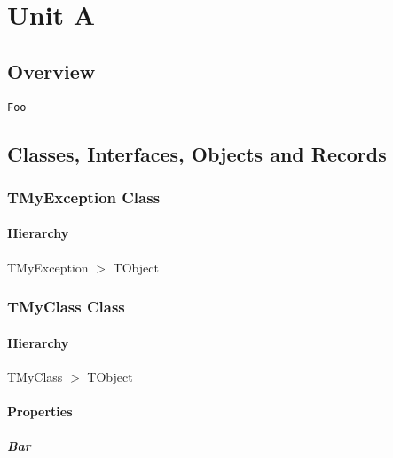 \documentclass{report}
\begin{document}
\newlength{\tmplength}
\chapter{Unit A}
\section{Overview}
\begin{description}
\item[\texttt{\begin{ttfamily}TMyException\end{ttfamily} Class}]
\item[\texttt{\begin{ttfamily}TMyClass\end{ttfamily} Class}]
\end{description}
\begin{description}
\item[\texttt{Foo}]
\end{description}
\section{Classes, Interfaces, Objects and Records}
\subsection*{TMyException Class}
\subsubsection*{\large{\textbf{Hierarchy}}\normalsize\hspace{1ex}\hfill}
TMyException {$>$} TObject
\subsection*{TMyClass Class}
\subsubsection*{\large{\textbf{Hierarchy}}\normalsize\hspace{1ex}\hfill}
TMyClass {$>$} TObject
\subsubsection*{\large{\textbf{Properties}}\normalsize\hspace{1ex}\hfill}
\paragraph*{Bar}\hspace*{\fill}
\end{document}
